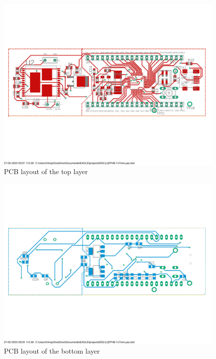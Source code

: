 \documentclass{article}
\begin{document}
\begin{figure}[htp]
    \centering
    \includegraphics[width=\textwidth]{Images/ourpcbtop.pdf}
    \caption{PCB layout of the top layer}
    \label{fig:galaxy}
\end{figure}

\begin{figure}[htp]
    \centering
    \includegraphics[width=\textwidth]{Images/ourpcbbottom.pdf}
    \caption{PCB layout of the bottom layer}
    \label{fig:galaxy}
\end{figure}
\end{document}
